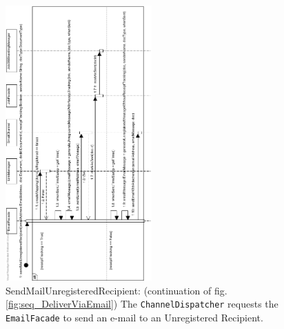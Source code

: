 \documentclass[a4paper,10pt]{article}
\begin{document}
\begin{figure}[!htp]
    \centering
    \includegraphics[width=0.5\textwidth]{SendMailUnregisteredRecipient.png}
    \caption{SendMailUnregisteredRecipient: (continuation of fig. \ref{fig:seq_DeliverViaEmail}) The \texttt{ChannelDispatcher} requests the \texttt{EmailFacade} to send an e-mail to an Unregistered Recipient.
    }\label{fig:seq_SendMailUnregisteredRecipient}
\end{figure}
\end{document}
